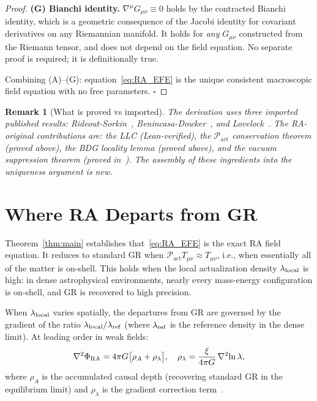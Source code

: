 \documentclass[11pt,a4paper]{article}
\newtheorem{remark}[theorem]{Remark}
\newcommand{\Pact}{\mathcal{P}_{\mathrm{act}}}
\begin{document}
\begin{proof}
\medskip
\textbf{(G) Bianchi identity.}
$\nabla^\mu G_{\mu\nu} \equiv 0$ holds by the contracted Bianchi
identity, which is a geometric consequence of the Jacobi identity for
covariant derivatives on any Riemannian manifold. It holds for
\emph{any} $G_{\mu\nu}$ constructed from the Riemann tensor, and does
not depend on the field equation. No separate proof is required; it
is definitionally true.

\medskip
Combining (A)--(G): equation~\eqref{eq:RA_EFE} is the unique
consistent macroscopic field equation with no free parameters.
\hfill$\square$
\end{proof}

\begin{remark}[What is proved vs imported]
The derivation uses three imported published results:
Rideout-Sorkin~\citep{RideoutSorkin2000}, Benincasa-Dowker~\citep{Benincasa2010},
and Lovelock~\citep{Lovelock1971}. The RA-original contributions are:
the LLC (Lean-verified), the $\Pact$ conservation theorem (proved
above), the BDG locality lemma (proved above), and the vacuum
suppression theorem (proved in~\citep{Sandeman2026RAGC}).
The assembly of these ingredients into the uniqueness argument is new.
\end{remark}

\section{Where RA Departs from GR}
\label{sec:departures}

Theorem~\ref{thm:main} establishes that~\eqref{eq:RA_EFE} is the
exact RA field equation. It reduces to standard GR when
$\Pact T_{\mu\nu} \approx T_{\mu\nu}$, i.e., when essentially all
of the matter is on-shell. This holds when the local actualization
density $\lambda_{\rm local}$ is high: in dense astrophysical
environments, nearly every mass-energy configuration is on-shell, and
GR is recovered to high precision.

When $\lambda_{\rm local}$ varies spatially, the departures from GR
are governed by the gradient of the ratio $\lambda_{\rm local}/\lambda_{\rm ref}$
(where $\lambda_{\rm ref}$ is the reference density in the dense
limit). At leading order in weak fields:
\begin{equation}
  \nabla^2\Phi_{\rm RA}
  = 4\pi G\bigl[\rho_A + \rho_\lambda\bigr],
  \quad
  \rho_\lambda = \frac{\xi}{4\pi G}\,\nabla^2\!\ln\lambda,
  \label{eq:RA_correction}
\end{equation}
where $\rho_A$ is the accumulated causal depth (recovering standard
GR in the equilibrium limit) and $\rho_\lambda$ is the gradient
correction term~\citep{Sandeman2026RADM}.
\end{document}
